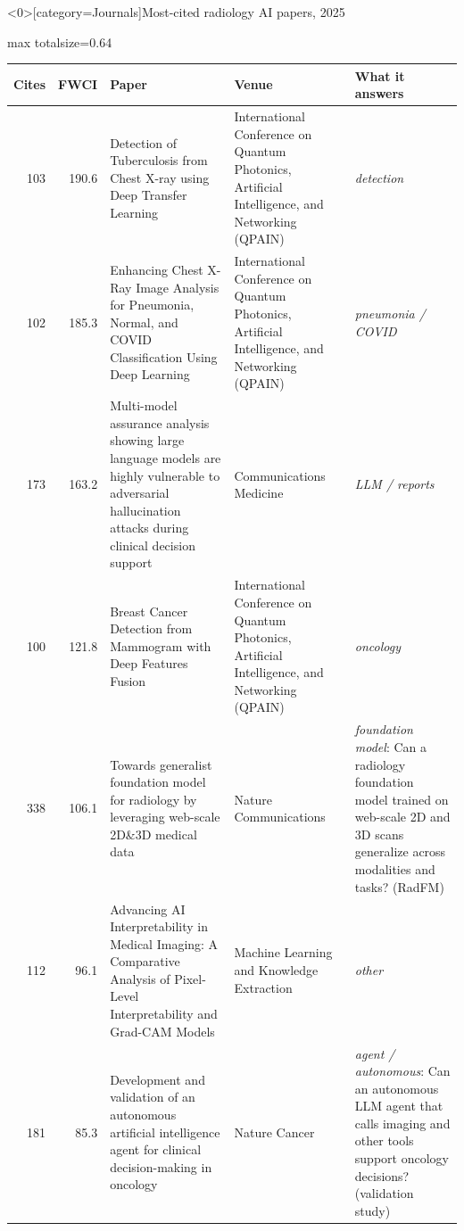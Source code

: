 \documentclass[aspectratio=169]{beamer}
\renewcommand{\arraystretch}{1.08}
\begin{document}
\begin{frame}<0>[category=Journals]{Most-cited radiology AI papers, 2025}
\tiny
\begin{adjustbox}{max totalsize={\textwidth}{0.64\textheight}}
\renewcommand{\arraystretch}{1.2}
\begin{tabular}{|r|r|>{\raggedright\arraybackslash}p{}|>{\raggedright\arraybackslash}p{}|>{\raggedright\arraybackslash}p{}|}
\hline \textbf{Cites} & \textbf{FWCI} & \textbf{Paper} & \textbf{Venue} & \textbf{What it answers} \\ \hline
103 & 190.6 & Detection of Tuberculosis from Chest X-ray using Deep Transfer Learning & 2025 International Conference on Quantum Photonics, Artificial Intelligence, and Networking (QPAIN) & \textit{detection} \\ \hline
102 & 185.3 & Enhancing Chest X-Ray Image Analysis for Pneumonia, Normal, and COVID Classification Using Deep Learning & 2025 International Conference on Quantum Photonics, Artificial Intelligence, and Networking (QPAIN) & \textit{pneumonia / COVID} \\ \hline
173 & 163.2 & Multi-model assurance analysis showing large language models are highly vulnerable to adversarial hallucination attacks during clinical decision support & Communications Medicine & \textit{LLM / reports} \\ \hline
100 & 121.8 & Breast Cancer Detection from Mammogram with Deep Features Fusion & 2025 International Conference on Quantum Photonics, Artificial Intelligence, and Networking (QPAIN) & \textit{oncology} \\ \hline
338 & 106.1 & Towards generalist foundation model for radiology by leveraging web-scale 2D\&3D medical data & Nature Communications & \textit{foundation model}: Can a radiology foundation model trained on web-scale 2D and 3D scans generalize across modalities and tasks? (RadFM) \\ \hline
112 & 96.1 & Advancing AI Interpretability in Medical Imaging: A Comparative Analysis of Pixel-Level Interpretability and Grad-CAM Models & Machine Learning and Knowledge Extraction & \textit{other} \\ \hline
181 & 85.3 & Development and validation of an autonomous artificial intelligence agent for clinical decision-making in oncology & Nature Cancer & \textit{agent / autonomous}: Can an autonomous LLM agent that calls imaging and other tools support oncology decisions? (validation study) \\ \hline

\end{tabular}
\end{adjustbox}
\end{frame}
\end{document}
